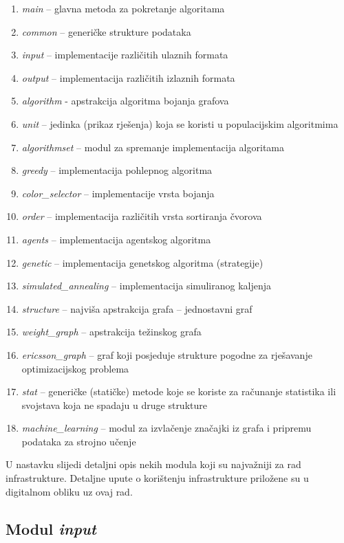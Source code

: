 \documentclass[times, utf8, diplomski, numeric]{fer}
\begin{document}
\begin{enumerate}
	\item \emph{main} -- glavna metoda za pokretanje algoritama
	\item \emph{common} -- generičke strukture podataka
	\item \emph{input} -- implementacije različitih ulaznih formata
	\item \emph{output} -- implementacija različitih izlaznih formata
	\item \emph{algorithm} - apstrakcija algoritma bojanja grafova
	\item \emph{unit} -- jedinka (prikaz rješenja) koja se koristi u populacijskim algoritmima
	\item \emph{algorithmset} -- modul za spremanje implementacija algoritama
	\item \emph{greedy} -- implementacija pohlepnog algoritma
	\item \emph{color\_selector} -- implementacije vrsta bojanja
	\item \emph{order} -- implementacija različitih vrsta sortiranja čvorova
	\item \emph{agents} -- implementacija agentskog algoritma
	\item \emph{genetic} -- implementacija genetskog algoritma (strategije)
	\item \emph{simulated\_annealing} -- implementacija simuliranog kaljenja
	\item \emph{structure} -- najviša apstrakcija grafa -- jednostavni graf
	\item \emph{weight\_graph} -- apstrakcija težinskog grafa 
	\item \emph{ericsson\_graph} -- graf koji posjeduje strukture pogodne za rješavanje optimizacijskog problema
	\item \emph{stat} -- generičke (statičke) metode koje se koriste za računanje statistika ili svojstava koja ne spadaju u druge strukture
	\item \emph{machine\_learning} -- modul za izvlačenje značajki iz grafa i pripremu podataka za strojno učenje
\end{enumerate}

U nastavku slijedi detaljni opis nekih modula koji su najvažniji za rad infrastrukture. Detaljne upute o korištenju infrastrukture priložene su u digitalnom obliku uz ovaj rad.

\subsection{Modul \emph{input}}
\end{document}
